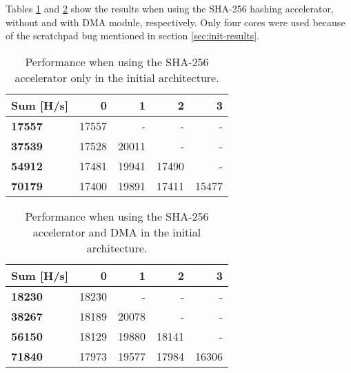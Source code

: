\begin{appendix}
Tables \ref{tab:Perf-SHA1} and \ref{tab:Perf-SHADMA1} show the results when using the SHA-256 hashing accelerator, without and with DMA module, respectively.
Only four cores were used because of the scratchpad bug mentioned in section \ref{sec:init-results}.


\begin{table}
\centering
\begin{tabular}{| l || r r r r |}
  \hline 
  \textbf{Sum} [H/s] & \textbf{0} & \textbf{1} & \textbf{2} & \textbf{3}\\
  \hline                       
  \textbf{17557} & 17557 & - & - & - \\
  \textbf{37539} & 17528 & 20011 & - & - \\
  \textbf{54912} & 17481 & 19941 & 17490 & - \\
  \textbf{70179} & 17400 & 19891 & 17411 & 15477 \\
  \hline  
\end{tabular}
\caption{Performance when using the SHA-256 accelerator only in the initial architecture.}
\label{tab:Perf-SHA1}
\end{table}


\begin{table}
\centering
\begin{tabular}{| l || r r r r |}
  \hline 
  \textbf{Sum} [H/s] & \textbf{0} & \textbf{1} & \textbf{2} & \textbf{3}\\
  \hline                       
  \textbf{18230} & 18230 & - & - & - \\
  \textbf{38267} & 18189 & 20078 & - & - \\
  \textbf{56150} & 18129 & 19880 & 18141 & - \\
  \textbf{71840} & 17973 & 19577 & 17984 & 16306 \\
  \hline  
\end{tabular}
\caption{Performance when using the SHA-256 accelerator and DMA in the initial architecture.}
\label{tab:Perf-SHADMA1}
\end{table}
		

\end{appendix}
